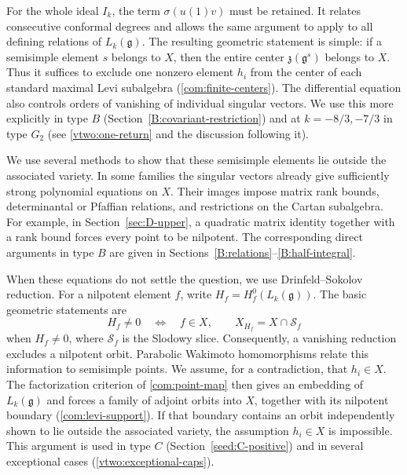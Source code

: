 \documentclass[11pt,a4paper]{amsart}
\numberwithin{equation}{section}
\theoremstyle{definition}
\theoremstyle{remark}
\newcommand{\g}{\mathfrak g}
\begin{document}
For the whole ideal $I_k$, the term $\sigma(u(1)v)$ must be retained.
It relates consecutive conformal degrees and allows the same argument
to apply to all defining relations of $L_k(\g)$. The resulting
geometric statement is simple: if a semisimple element $s$ belongs
to $X$, then the entire center $\mathfrak z(\g^s)$ belongs to $X$.
Thus it suffices to exclude one nonzero element $h_i$ from the center
of each standard maximal Levi subalgebra
(\cref{com:finite-centers}). The differential equation also controls
orders of vanishing of individual singular vectors. We use this more
explicitly in type $B$ (Section~\ref{B:covariant-restriction}) and
at $k=-8/3,-7/3$ in type $G_2$ (see \cref{vtwo:one-return} and the discussion following it).

We use several methods to show that these semisimple elements lie outside the associated variety. In some
families the singular vectors already give sufficiently strong
polynomial equations on $X$. Their images impose matrix rank bounds,
determinantal or Pfaffian relations, and restrictions on the Cartan
subalgebra. For example, in Section~\ref{sec:D-upper}, a quadratic
matrix identity together with a rank bound forces every point to be
nilpotent. The corresponding direct arguments in type $B$ are given
in Sections~\ref{B:relations}--\ref{B:half-integral}.

When these equations do not settle the question, we use
Drinfeld--Sokolov reduction. For a nilpotent element $f$, write
$H_f=H_f^0(L_k(\g))$. The basic geometric statements are
$$
 H_f\ne0\quad\Longleftrightarrow\quad f\in X,
 \qquad X_{H_f}=X\cap\mathcal S_f
$$
when $H_f\ne0$, where $\mathcal S_f$ is the Slodowy slice.
Consequently, a vanishing reduction excludes a nilpotent orbit.
Parabolic Wakimoto homomorphisms relate this information to semisimple
points. We assume, for a contradiction, that $h_i\in X$. The
factorization criterion of \cref{com:point-map} then gives an embedding
of $L_k(\g)$ and forces a family of adjoint orbits into $X$, together
with its nilpotent boundary (\cref{com:levi-support}). If that boundary
contains an orbit independently shown to lie outside the associated variety, the assumption $h_i\in X$
is impossible. This argument is used in type $C$
(Section~\ref{seed:C-positive}) and in several exceptional cases
(\cref{vtwo:exceptional-caps}).
\end{document}
